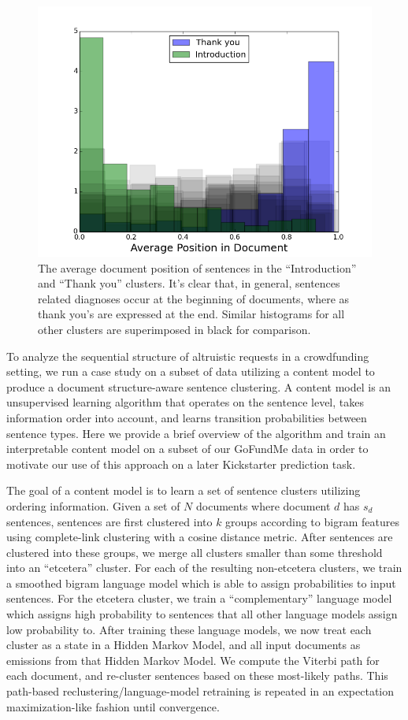 \documentclass[letterpaper]{article}
\begin{document}
\begin{figure}
\centering
\includegraphics[width=.45\textwidth]{figures/docpos.png}
\caption{The average document position of sentences in the ``Introduction'' and ``Thank you'' clusters. It's clear that, in general, sentences related diagnoses occur at the beginning of documents, where as thank you's are expressed at the end. Similar histograms for all other clusters are superimposed in black for comparison.}
\label{fig:docpos}
\end{figure}

To analyze the sequential structure of altruistic requests in a crowdfunding setting, we run a case study on a subset of data utilizing a content model \cite{barzilay2004catching} to produce a document structure-aware sentence clustering. A content model is an unsupervised learning algorithm that operates on the sentence level, takes information order into account, and learns transition probabilities between sentence types. Here we provide a brief overview of the algorithm and train an interpretable content model on a subset of our GoFundMe data in order to motivate our use of this approach on a later Kickstarter prediction task.

The goal of a content model is to learn a set of sentence clusters utilizing ordering information. Given a set of $N$ documents where document $d$ has $s_d$ sentences, sentences are first clustered into $k$ groups according to bigram features using complete-link clustering with a cosine distance metric. After sentences are clustered into these groups, we merge all clusters smaller than some threshold into an ``etcetera'' cluster. For each of the resulting non-etcetera clusters, we train a smoothed bigram language model which is able to assign probabilities to input sentences. For the etcetera cluster, we train a ``complementary'' language model which assigns high probability to sentences that all other language models assign low probability to. After training these language models, we now treat each cluster as a state in a Hidden Markov Model, and all input documents as emissions from that Hidden Markov Model. We compute the Viterbi path for each document, and re-cluster sentences based on these most-likely paths. This path-based reclustering/language-model retraining is repeated in an expectation maximization-like fashion until convergence. 
\end{document}
